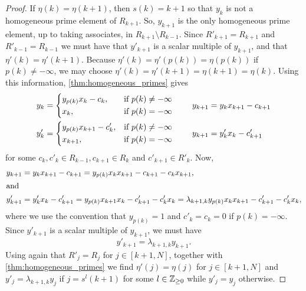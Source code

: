\begin{proof}
	If $\eta(k) = \eta(k+1)$, then $s(k) = k+1$ so that $y_k$ is not a homogeneous prime
	element of $R_{k+1}$. So, $y_{k+1}$ is the only homogeneous prime element, up to taking
	associates, in $R_{k+1}\setminus R_{k-1}$. Since $R'_{k+1} = R_{k+1}$ and $R'_{k-1} =
		R_{k-1}$ we must have that $y'_{k+1}$ is a scalar multiple of $y_{k+1}$, and that
	$\eta'(k) = \eta'(k+1)$. Because $\eta'(k) = \eta'(p(k)) = \eta(p(k))$ if $p(k) \neq
		-\infty$, we may choose $\eta'(k) = \eta'(k+1) = \eta(k+1) = \eta(k)$. Using this
	information, \cref{thm:homogeneous_primes} gives
	\begin{equation}\label{eq:recursive_yk_y_k_prime}
		\begin{alignedat}{2}
			y_k &= \begin{dcases*}
				\mathrlap{y_{p(k)}x_k - c_k,}\hphantom{y_{p(k)}x_{k+1}-c'_k,} & if $p(k) \neq -\infty$ \\
				x_k,                                                          & if $p(k) = -\infty$
			\end{dcases*}
			&
			y_{k+1} &= y_k x_{k+1} - c_{k+1}\\
			y'_k    & = \begin{dcases*}
				y_{p(k)}x_{k+1} - c'_k, & if $p(k) \neq -\infty$ \\
				x_{k+1},                & if $p(k) = -\infty$
			\end{dcases*}
			\qquad
			&
			y_{k+1} & = y'_k x_k - c'_{k+1}
		\end{alignedat}
	\end{equation}
	for some $c_k,c'_k \in R_{k-1}, c_{k+1} \in R_k$ and $c'_{k+1} \in R'_{k}$. Now,
	\begin{align*}
		y_{k+1}  & = y_k x_{k+1} - c_{k+1} = y_{p(k)} x_k x_{k+1} - c_{k+1} - c_k x_{k+1} ,                                                        \\
		\shortintertext{and}
		y'_{k+1} & = y'_k x_k - c'_{k+1} = y_{p(k)}x_{k+1}x_k - c'_{k+1} - c'_k x_k = \lambda_{k+1, k}y_{p(k)}x_k x_{k+1} - c'_{k+1} - c'_{k} x_k,
	\end{align*}
	where we use the convention that $y_{p(k)} = 1$ and $c'_k = c_k = 0$ if $p(k) =
		-\infty$. Since $y'_{k+1}$ is a scalar multiple of $y_{k+1}$, we must have
	\begin{equation*}
		y'_{k+1} = \lambda_{k+1,k}y_{k+1}.
	\end{equation*}
	Using again that $R'_j = R_j$ for $j \in [k+1, N]$, together with
	\cref{thm:homogeneous_primes} we find $\eta'(j) = \eta(j)$ for $j\in [k+1, N]$ and
	$y'_j = \lambda_{k+1,k} y_j$ if $j = s^l(k+1)$ for some $l \in \mathbb{Z}_{\geq 0}$ while
	$y'_j = y_j$ otherwise.


\end{proof}
